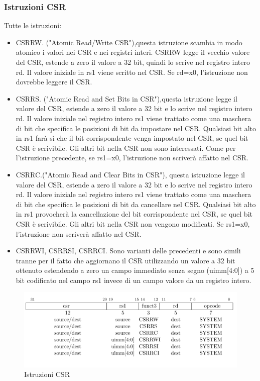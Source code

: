 \documentclass[12pt,a4paper]{report}
\begin{document}
\subsubsection{Istruzioni CSR}
Tutte le istruzioni:
\begin{itemize}
	\item CSRRW. ("Atomic Read/Write CSR"),questa istruzione scambia in modo atomico i valori nei CSR e nei registri interi. CSRRW legge il vecchio valore del CSR, estende a zero il valore a 32 bit, quindi lo scrive nel registro intero rd. Il valore iniziale in rs1 viene scritto nel CSR. Se rd=x0, l'istruzione non dovrebbe leggere il CSR.
	\item CSRRS. ("Atomic Read and Set Bits in CSR"),questa istruzione legge il valore del CSR, estende a zero il valore a 32 bit e lo scrive nel registro intero rd. Il valore iniziale nel registro intero rs1 viene trattato come una maschera di bit che specifica le posizioni di bit da impostare nel CSR. Qualsiasi bit alto in rs1 farà sì che il bit corrispondente venga impostato nel CSR, se quel bit CSR è scrivibile. Gli altri bit nella CSR non sono interessati. Come per l'istruzione precedente, se rs1=x0, l'istruzione non scriverà affatto nel CSR.
	\item CSRRC.("Atomic Read and Clear Bits in CSR"), questa istruzione legge il valore del CSR, estende a zero il valore a 32 bit e lo scrive nel registro intero rd. Il valore iniziale nel registro intero rs1 viene trattato come una maschera di bit che specifica le posizioni di bit da cancellare nel CSR. Qualsiasi bit alto in rs1 provocherà la cancellazione del bit corrispondente nel CSR, se quel bit CSR è scrivibile. Gli altri bit nella CSR non vengono modificati. Se rs1=x0, l'istruzione non scriverà affatto nel CSR.
	\item CSRRWI, CSRRSI, CSRRCI. Sono varianti delle precedenti e sono simili tranne per il fatto che aggiornano il CSR utilizzando un valore a 32 bit ottenuto estendendo a zero un campo immediato senza segno (uimm[4:0]) a 5 bit codificato nel campo rs1 invece di un campo valore da un registro intero.
\end{itemize}

\begin{figure}
	\includegraphics[width = \textwidth]{Istruzioni/Istruction9.png}
	\caption{Istruzioni CSR}
	\label{Fig:IstruzioniCSR}
\end{figure}
\end{document}
